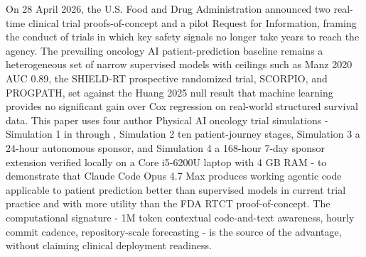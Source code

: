 \noindent
On 28 April 2026, the U.S. Food and Drug Administration announced two
real-time clinical trial proofs-of-concept and a pilot Request for
Information, framing the conduct of trials in which key safety signals
no longer take years to reach the agency. The
prevailing oncology AI patient-prediction baseline remains a
heterogeneous set of narrow supervised models with ceilings such as
Manz 2020 AUC 0.89, the SHIELD-RT prospective randomized trial,
SCORPIO, and PROGPATH, set against the Huang 2025 null result that
machine learning provides no significant gain over Cox regression on
real-world structured survival data. This paper uses four author
Physical AI oncology trial simulations - Simulation 1 in
 through , Simulation 2 ten patient-journey
stages, Simulation 3 a 24-hour autonomous sponsor, and Simulation 4 a
168-hour 7-day sponsor extension verified locally on a Core i5-6200U
laptop with 4 GB RAM - to demonstrate that Claude Code Opus 4.7 Max
produces working agentic code applicable to patient prediction better than supervised models in current trial practice and with more utility than the FDA
RTCT proof-of-concept. The computational
signature - 1M token contextual code-and-text awareness, hourly commit
cadence, repository-scale forecasting - is the source of the advantage,
without claiming clinical deployment readiness.
